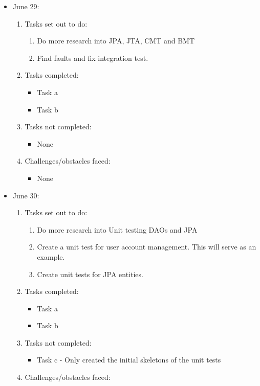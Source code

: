 \documentclass[12pt]{article}
\begin{document}
	\begin{itemize}
	\item June 29:
	\begin{enumerate}
		\item Tasks set out to do:
		\begin{enumerate}
			\item Do more research into JPA, JTA, CMT and BMT
			\item Find faults and fix integration test. 				
		\end{enumerate}
		\item Tasks completed:
		\begin{itemize}
			\item Task a
			\item Task b								
		\end{itemize}
		\item Tasks not completed:
		\begin{itemize}
			\item None
		\end{itemize}
		\item Challenges/obstacles faced:
		\begin{itemize}
			\item None
		\end{itemize}			
	\end{enumerate}
	\item June 30:
	\begin{enumerate}
		\item Tasks set out to do:
		\begin{enumerate}
			\item Do more research into Unit testing DAOs and JPA
			\item Create a unit test for user account management. This will serve as an example.
			\item Create unit tests for JPA entities.				
		\end{enumerate}
		\item Tasks completed:
		\begin{itemize}
			\item Task a
			\item Task b								
		\end{itemize}
		\item Tasks not completed:
		\begin{itemize}
			\item Task c - Only created the initial skeletons of the unit tests
		\end{itemize}
		\item Challenges/obstacles faced:

\end{enumerate}
\end{itemize}
\end{document}
